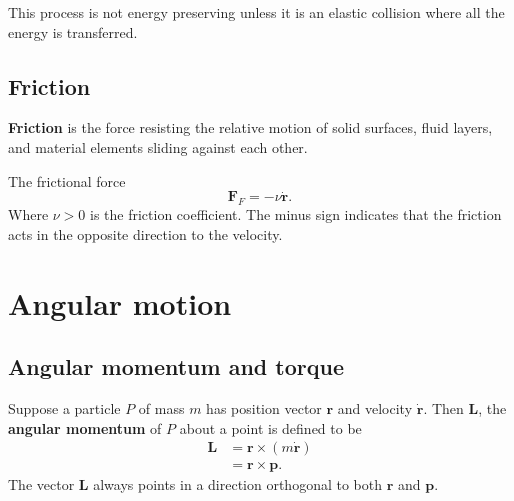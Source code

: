 \documentclass[12pt, a4paper]{article}
\begin{document}
\begin{mdnote}
    This process is not energy preserving unless it is an elastic collision where all the energy is transferred.
\end{mdnote}

\subsection{Friction}

\begin{definition}
    \textbf{Friction} is the force resisting the relative motion of solid surfaces, fluid layers, and material elements sliding against each other.
\end{definition}

\begin{mdthm}
    The frictional force 
    \[\bm{F}_F=-\nu \dot{\bm{r}}.\]
    Where \(\nu>0\) is the friction coefficient. The minus sign indicates that the friction acts in the opposite direction to the velocity.
\end{mdthm}


\section{Angular motion}

\subsection{Angular momentum and torque}

\begin{definition}
    Suppose a particle \(P\) of mass \(m\) has position vector \(\bm{r}\) and velocity \(\dot{\bm{r}}\). Then \(\bm{L}\), the \textbf{angular momentum} of \(P\) about a point is defined to be
    \[\begin{aligned}
        \bm{L}&=\bm{r} \times (m\dot{\bm{r}}) \\
            &= \bm{r} \times \bm{p}.
    \end{aligned}\]
    The vector \(\bm{L}\) always points in a direction orthogonal to both \(\bm{r}\) and \(\bm{p}\).
\end{definition}
\end{document}
